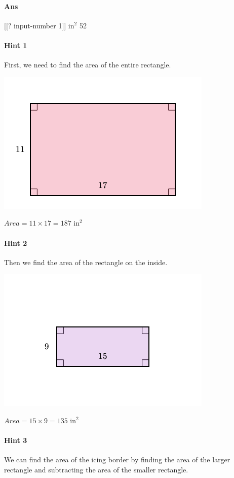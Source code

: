 \documentclass[twocolumn,10pt]{article}
\def\shrinkfactor{0.55}
\begin{document}
\paragraph{Ans}  [[? input-number 1]] $\text{in}^2$  52

\paragraph{Hint 1}First, we need to find the area of the entire rectangle.  


\includegraphics[scale=\shrinkfactor]{figures/c78ac2659291464a5983a0bb8875175436f355d1.png}  
 
$Area=11\times17=187  \text{ in}^2$  

\paragraph{Hint 2}Then we find the area of the rectangle on the inside.  


\includegraphics[scale=\shrinkfactor]{figures/066ddfd1e947feed322c4fc9aec956edd50e9014.png}

$Area=15\times9=135  \text{ in}^2$  

\paragraph{Hint 3}We can find the area of the icing border by finding the area of the larger rectangle and subtracting the area of the smaller rectangle. 
\end{document}

